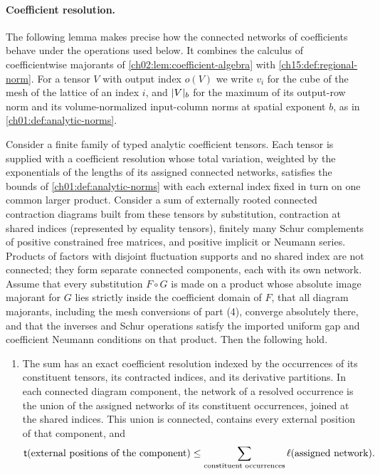 \paragraph{Coefficient resolution.}
The following lemma makes precise how the connected networks of coefficients behave under the operations used below. It combines the calculus of coefficientwise majorants of \cref{ch02:lem:coefficient-algebra} with \cref{ch15:def:regional-norm}. For a tensor $V$ with output index $o(V)$ we write $v_i$ for the cube of the mesh of the lattice of an index $i$, and $\lvert V\rvert_b$ for the maximum of its output-row norm and its volume-normalized input-column norms at spatial exponent $b$, as in \cref{ch01:def:analytic-norms}.

\begin{lemma}\label{ch17:lem:coefficient-resolution}
Consider a finite family of typed analytic coefficient tensors. Each tensor is supplied with a coefficient resolution whose total variation, weighted by the exponentials of the lengths of its assigned connected networks, satisfies the bounds of \cref{ch01:def:analytic-norms} with each external index fixed in turn on one common larger product. Consider a sum of externally rooted connected contraction diagrams built from these tensors by substitution, contraction at shared indices (represented by equality tensors), finitely many Schur complements of positive constrained free matrices, and positive implicit or Neumann series. Products of factors with disjoint fluctuation supports and no shared index are not connected; they form separate connected components, each with its own network. Assume that every substitution $F\circ G$ is made on a product whose absolute image majorant for $G$ lies strictly inside the coefficient domain of $F$, that all diagram majorants, including the mesh conversions of part (4), converge absolutely there, and that the inverses and Schur operations satisfy the imported uniform gap and coefficient Neumann conditions on that product. Then the following hold.
\begin{enumerate}
\item The sum has an exact coefficient resolution indexed by the occurrences of its constituent tensors, its contracted indices, and its derivative partitions. In each connected diagram component, the network of a resolved occurrence is the union of the assigned networks of its constituent occurrences, joined at the shared indices. This union is connected, contains every external position of that component, and
\[
 \mathsf t(\text{external positions of the component})\le\sum_{\text{constituent occurrences}}\ell(\text{assigned network}).
\]
\end{enumerate}
\end{lemma}
